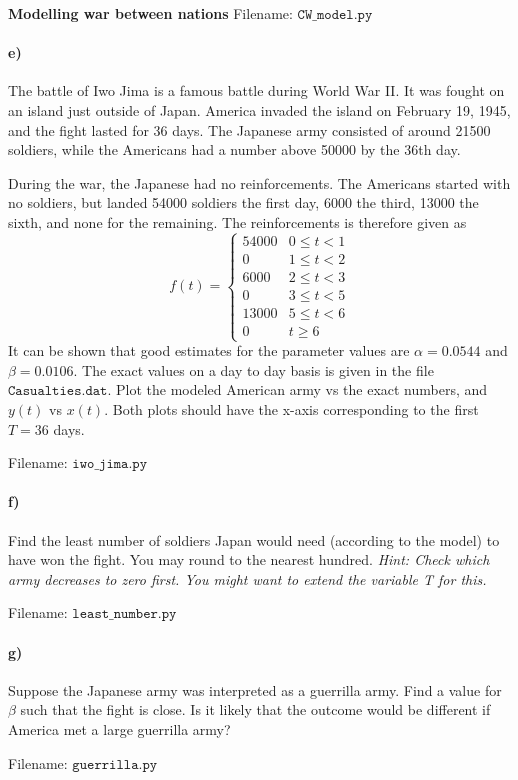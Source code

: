 \begin{Problem}{\textbf{Modelling war between nations}}
Filename: $\texttt{CW\_model.py}$

\paragraph{e)}
The battle of Iwo Jima is a famous battle during World War II. It was fought on
an island just outside of Japan. America invaded the island on February 19, 1945,
and the fight lasted for 36 days. The Japanese army consisted of around 21500
soldiers, while the Americans had a number above 50000 by the 36th day.

During the war, the Japanese had no reinforcements. The Americans started with no
soldiers, but landed 54000 soldiers the first day, 6000 the third, 13000 the sixth, and none
for the remaining. The reinforcements is therefore given as
\begin{equation*}
    f(t)=\begin{cases}
        54000 & 0\leq t<1 \\
        0 & 1 \leq t < 2 \\
        6000 & 2 \leq t < 3 \\
        0 & 3 \leq t < 5 \\
        13000 & 5 \leq t < 6 \\
        0 & t \geq 6
    \end{cases}
\end{equation*}
It can be shown that good estimates for the parameter values are $\alpha=0.0544$
and $\beta = 0.0106$. %
The exact values on a day to day basis is
given in the file $\texttt{Casualties.dat}$. Plot
the modeled American army vs the exact numbers, and $y(t)$ vs $x(t)$.
Both plots should have the x-axis corresponding to the first $T = 36$ days.

Filename: $\texttt{iwo\_jima.py}$

\paragraph{f)}
Find the least number of soldiers Japan would need (according to the model)
to have won the fight. You may round to the nearest hundred.
\emph{Hint: Check which army decreases to zero first. You might want to extend the
variable T for this.}

Filename: $\texttt{least\_number.py}$

\paragraph{g)}
Suppose the Japanese army was interpreted as a guerrilla army. Find a value for $\beta$
such that the fight is close. Is it likely that the outcome would be different if
America met a large guerrilla army?

Filename: $\texttt{guerrilla.py}$
\end{Problem}

